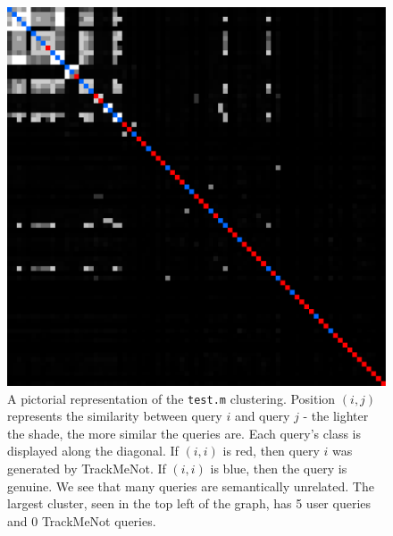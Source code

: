 \documentclass{llncs}
\begin{document}
\begin{multicols}{2}
  \begin{figure}[h]
    \centering
    \includegraphics[width=\linewidth]{test}
    \caption{A pictorial representation of the \texttt{test.m}
      clustering. Position $(i,j)$ represents the similarity between
      query $i$ and query $j$ - the lighter the shade, the more
      similar the queries are. Each query's class is displayed along
      the diagonal. If $(i,i)$ is red, then query $i$ was generated by
      TrackMeNot. If $(i,i)$ is blue, then the query is genuine. We
      see that many queries are semantically unrelated. The largest
      cluster, seen in the top left of the graph, has 5 user queries and 0
      TrackMeNot queries.}
    \label{fig:disco.test}
  \end{figure}



\end{multicols}
\end{document}
